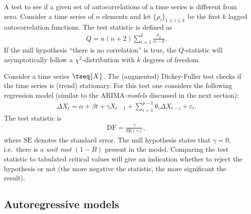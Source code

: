     \begin{method}
        A test to see if a given set of autocorrelations of a time series is different from zero. Consider a time series of $n$ elements and let $\{\rho_i\}_{1\leq i\leq k}$ be the first $k$ lagged autocorrelation functions. The test statistic is defined as
        \begin{gather}
            Q = n(n+2)\sum_{i=1}^k\frac{\rho_k}{n-k}.
        \end{gather}
        If the null hypothesis ``there is no correlation'' is true, the $Q$-statistic will asymptotically follow a $\chi^2$-distribution with $k$ degrees of freedom.
    \end{method}

    \begin{method}
        Consider a time series $\tseq{X}$. The (augmented) Dickey-Fuller test checks if the time series is (trend) stationary. For this test one considers the following regression model (similar to the ARIMA\textit{-models} discussed in the next section):
        \begin{gather}
            \Delta X_t = \alpha + \beta t + \gamma X_{t-1} + \sum_{i=1}^{p-1} \theta_i\Delta X_{t-i} + \varepsilon_t.
        \end{gather}
        The test statistic is
        \begin{gather}
            \mathrm{DF} = \frac{\gamma}{\mathrm{SE}(\gamma)},
        \end{gather}
        where $\mathrm{SE}$ denotes the standard error. The null hypothesis states that $\gamma=0$, i.e.~there is a \textit{unit root} $(1-B)$ present in the model. Comparing the test statistic to tabulated critical values will give an indication whether to reject the hypothesis or not (the more negative the statistic, the more significant the result).
    \end{method}

\subsection{Autoregressive models}


